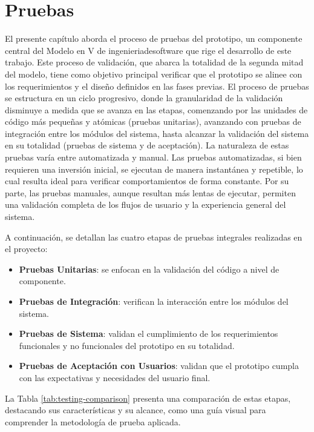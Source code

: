 \chapter[Pruebas]{Pruebas}
\label{cp:testing}

\parindent0pt

El presente capítulo aborda el proceso de pruebas del prototipo, un componente central del Modelo en V de \gls{ingenieriadesoftware} que rige el desarrollo de este trabajo. Este proceso de validación, que abarca la totalidad de la segunda mitad del modelo, tiene como objetivo principal verificar que el prototipo se alinee con los requerimientos y el diseño definidos en las fases previas. El proceso de pruebas se estructura en un ciclo progresivo, donde la granularidad de la validación disminuye a medida que se avanza en las etapas, comenzando por las unidades de código más pequeñas y atómicas (pruebas unitarias), avanzando con pruebas de integración entre los módulos del sistema, hasta alcanzar la validación del sistema en su totalidad (pruebas de sistema y de aceptación). La naturaleza de estas pruebas varía entre automatizada y manual. Las pruebas automatizadas, si bien requieren una inversión inicial, se ejecutan de manera instantánea y repetible, lo cual resulta ideal para verificar comportamientos de forma constante. Por su parte, las pruebas manuales, aunque resultan más lentas de ejecutar, permiten una validación completa de los flujos de usuario y la experiencia general del sistema.

A continuación, se detallan las cuatro etapas de pruebas integrales realizadas en el proyecto:

\begin{itemize}
\item \textbf{Pruebas Unitarias}: se enfocan en la validación del código a nivel de componente.
\item \textbf{Pruebas de Integración}: verifican la interacción entre los módulos del sistema.
\item \textbf{Pruebas de Sistema}: validan el cumplimiento de los requerimientos funcionales y no funcionales del prototipo en su totalidad.
\item \textbf{Pruebas de Aceptación con Usuarios}: validan que el prototipo cumpla con las expectativas y necesidades del usuario final.
\end{itemize}

La Tabla \ref{tab:testing-comparison} presenta una comparación de estas etapas, destacando sus características y su alcance, como una guía visual para comprender la metodología de prueba aplicada.

